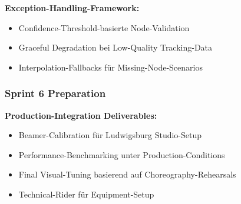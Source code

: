\textbf{Exception-Handling-Framework:}
\begin{itemize}
    \item Confidence-Threshold-basierte Node-Validation
    \item Graceful Degradation bei Low-Quality Tracking-Data
    \item Interpolation-Fallbacks für Missing-Node-Scenarios
\end{itemize}

\subsubsection{Sprint 6 Preparation}

\textbf{Production-Integration Deliverables:}
\begin{itemize}
    \item Beamer-Calibration für Ludwigsburg Studio-Setup
    \item Performance-Benchmarking unter Production-Conditions
    \item Final Visual-Tuning basierend auf Choreography-Rehearsals
    \item Technical-Rider für Equipment-Setup
\end{itemize}
